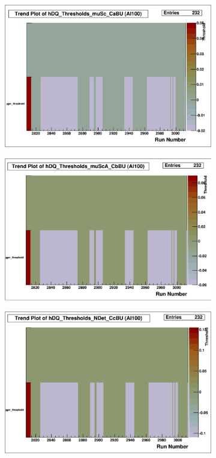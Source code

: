 \documentclass[a4paper]{article}
\begin{document}
\begin{figure}
  \centering
  \begin{subfigure}{0.4\textwidth}
    \includegraphics[width=\linewidth]{figs/al100/cabu_thresh}
    \caption{}\label{fig:al100_cabu_thresh}
  \end{subfigure}%
  \begin{subfigure}{0.4\textwidth}
    \includegraphics[width=\linewidth]{figs/al100/cbbu_thresh}
    \caption{}\label{fig:al100_cbbu_thresh}
  \end{subfigure}
  \begin{subfigure}{0.4\textwidth}
    \includegraphics[width=\linewidth]{figs/al100/ccbu_thresh}

\end{subfigure}
\end{figure}
\end{document}
